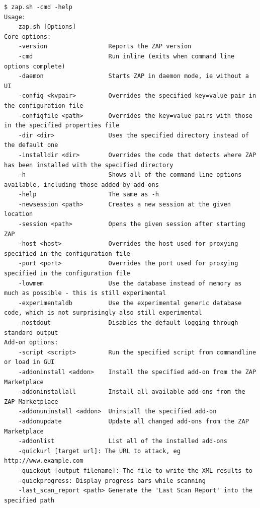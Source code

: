 \begin{minipage}{\linewidth}
\begin{lstlisting}[caption={Options de ZAP en ligne de commande},label={lst:zap_options},numbers=none]
$ zap.sh -cmd -help
Usage:
    zap.sh [Options]
Core options:
    -version                 Reports the ZAP version
    -cmd                     Run inline (exits when command line options complete)
    -daemon                  Starts ZAP in daemon mode, ie without a UI
    -config <kvpair>         Overrides the specified key=value pair in the configuration file
    -configfile <path>       Overrides the key=value pairs with those in the specified properties file
    -dir <dir>               Uses the specified directory instead of the default one
    -installdir <dir>        Overrides the code that detects where ZAP has been installed with the specified directory
    -h                       Shows all of the command line options available, including those added by add-ons
    -help                    The same as -h
    -newsession <path>       Creates a new session at the given location
    -session <path>          Opens the given session after starting ZAP
    -host <host>             Overrides the host used for proxying specified in the configuration file
    -port <port>             Overrides the port used for proxying specified in the configuration file
    -lowmem                  Use the database instead of memory as much as possible - this is still experimental
    -experimentaldb          Use the experimental generic database code, which is not surprisingly also still experimental
    -nostdout                Disables the default logging through standard output
Add-on options:
    -script <script>         Run the specified script from commandline or load in GUI
    -addoninstall <addon>    Install the specified add-on from the ZAP Marketplace
    -addoninstallall         Install all available add-ons from the ZAP Marketplace
    -addonuninstall <addon>  Uninstall the specified add-on
    -addonupdate             Update all changed add-ons from the ZAP Marketplace
    -addonlist               List all of the installed add-ons
    -quickurl [target url]: The URL to attack, eg http://www.example.com
    -quickout [output filename]: The file to write the XML results to
    -quickprogress: Display progress bars while scanning
    -last_scan_report <path> Generate the 'Last Scan Report' into the specified path
\end{lstlisting}
\end{minipage}

